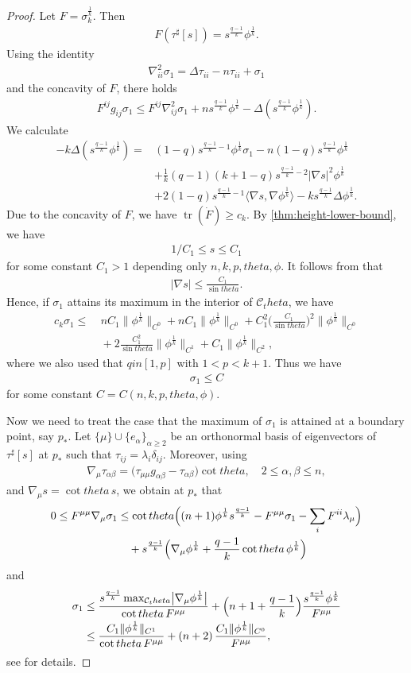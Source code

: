 \documentclass[12pt]{amsart}
\def\theta{theta}%
\def\in{in }%
\numberwithin{equation}{section}
\newcommand{\8}{\infty}
\newcommand{\de}{\delta}
\newcommand{\la}{\lambda}
\newcommand{\si}{\sigma}
\newcommand{\De}{\Delta}
\newcommand{\cC}{\mathcal{C}}
\newcommand{\eq}[1]{\begin{equation}\begin{alignedat}{2}#1\end{alignedat}\end{equation}}
\newcommand{\Cth}{\cC_\theta}
\begin{document}
\begin{proof}
Let $F = \sigma_k^{\frac{1}{k}}$. Then
\eq{\label{normalize-eq-q}
F(\tau^\sharp[s])= s^{\frac{q-1}{k}}\phi^{\frac{1}{k}}.
}
Using the identity
\eq{
 \nabla^2_{ii}\si_1=\De \tau_{ii}-n\tau_{ii}+\sigma_1
}
and the concavity of $F$, there holds
\eq{
F^{ij}g_{ij}\si_1 \leq F^{ij}\nabla^2_{ij}\si_1+ns^\frac{q-1}{k}\phi^\frac{1}{k}-\De (s^\frac{q-1}{k}\phi^\frac{1}{k}).
}
We calculate
\eq{
-k\De (s^\frac{q-1}{k}\phi^\frac{1}{k}) =& (1-q)s^{\frac{q-1}{k}-1}\phi^\frac{1}{k}\si_1-n(1-q)s^\frac{q-1}{k}\phi^\frac{1}{k}\\
&+\frac{1}{k}(q-1)(k+1-q)s^{\frac{q-1}{k}-2}|\nabla s|^2 \phi^\frac{1}{k}\\
&+2(1-q)s^{\frac{q-1}{k}-1}\langle \nabla s,\nabla \phi^\frac{1}{k}\rangle-k s^\frac{q-1}{k} \De \phi^\frac{1}{k}.
}
Due to the concavity of $F$, we have $\operatorname{tr}(\dot{F})\geq c_{k}$. By \autoref{thm:height-lower-bound}, we have
\eq{\label{s-bound}
1/C_1\leq s\leq C_1
}
for some constant $C_1>1$ depending only $n,k,p,\theta,\phi$. It follows from \cite[Lem. 4.8]{HIS25} that 
\eq{
|\nabla s|\leq \frac{C_1}{\sin\theta}.
}
Hence, if $\si_1$ attains its maximum in the interior of $\cC_\theta$, we have
\eq{
c_k\si_1 \leq &~ n C_1\|\phi^\frac{1}{k}\|_{C^0}+nC_1\|\phi^\frac{1}{k}\|_{C^0}+C_1^2 \big(\frac{C_1}{\sin\theta}\big)^2 \|\phi^\frac{1}{k}\|_{C^0}\\
&~+2 \frac{C_1^2}{\sin\theta}\|\phi^\frac{1}{k}\|_{C^1}+C_1\|\phi^\frac{1}{k}\|_{C^2},
}
where we also used that $q\in [1,p]$ with $1<p<k+1$. Thus we have 
\eq{
\si_1\leq C
}
for some constant $C=C(n,k,p,\theta,\phi)$.

Now we need to treat the case that the maximum of $\sigma_1$ is attained at a boundary point, say $p_{\ast}$. Let $\{\mu\} \cup \{e_{\alpha}\}_{\alpha\geq 2}$ be an orthonormal basis of eigenvectors of $\tau^{\sharp}[s]$ at $p_{\ast}$ such that $\tau_{ij}=\la_i \de_{ij}$. Moreover, using
\eq{\label{important identity}
  \nabla_{\mu}\tau_{\alpha\beta}
  = \bigl(\tau_{\mu\mu} g_{\alpha\beta} - \tau_{\alpha\beta}\bigr)\cot\theta,
  \quad 2\le \alpha,\beta\le n,
}
and $\nabla_{\mu}s = \cot\theta\,s$, we obtain at $p_\ast$ that
\eq{\label{second proof}
0\le F^{\mu\mu}\nabla_{\mu}\sigma_1&\le \cot\theta
    \Bigl((n+1)\phi^{\frac{1}{k}}s^{\frac{q-1}{k}}
          - F^{\mu\mu}\sigma_1
          - \sum_i F^{ii}\la_{\mu}\Bigr)\\
&\quad
  + s^{\frac{q-1}{k}}
    \Bigl(\nabla_{\mu}\phi^{\frac{1}{k}}
          + \frac{q-1}{k}\cot\theta\,\phi^{\frac{1}{k}}\Bigr)
}
and
\eq{\label{si1 bound 2nd proof}
  \sigma_1
  &\le \frac{s^{\frac{q-1}{k}}\max_{\Cth}\bigl|\nabla_{\mu}\phi^{\frac{1}{k}}\bigr|}
           {\cot\theta\,F^{\mu\mu}}
     + \Bigl(n+1+\frac{q-1}{k}\Bigr)
       \frac{s^{\frac{q-1}{k}}\phi^{\frac{1}{k}}}{F^{\mu\mu}}\\
  &\le \frac{C_1\|\phi^{\frac{1}{k}}\|_{C^1}}
           {\cot\theta\,F^{\mu\mu}}
     + (n+2)\,\frac{C_1\|\phi^{\frac{1}{k}}\|_{C^0}}{F^{\mu\mu}},
}
see \cite[(4.4),(4.5)]{HIS25} for details.


\end{proof}
\end{document}
